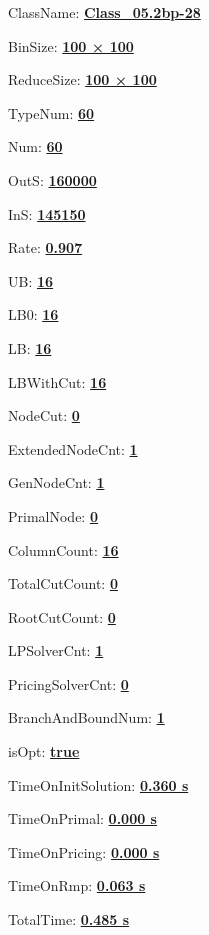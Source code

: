 \documentclass[11pt]{article}
\begin{document}
\pagestyle{empty}


ClassName: \underline{\textbf{Class_05.2bp-28}}
\par
BinSize: \underline{\textbf{100 × 100}}
\par
ReduceSize: \underline{\textbf{100 × 100}}
\par
TypeNum: \underline{\textbf{60}}
\par
Num: \underline{\textbf{60}}
\par
OutS: \underline{\textbf{160000}}
\par
InS: \underline{\textbf{145150}}
\par
Rate: \underline{\textbf{0.907}}
\par
UB: \underline{\textbf{16}}
\par
LB0: \underline{\textbf{16}}
\par
LB: \underline{\textbf{16}}
\par
LBWithCut: \underline{\textbf{16}}
\par
NodeCut: \underline{\textbf{0}}
\par
ExtendedNodeCnt: \underline{\textbf{1}}
\par
GenNodeCnt: \underline{\textbf{1}}
\par
PrimalNode: \underline{\textbf{0}}
\par
ColumnCount: \underline{\textbf{16}}
\par
TotalCutCount: \underline{\textbf{0}}
\par
RootCutCount: \underline{\textbf{0}}
\par
LPSolverCnt: \underline{\textbf{1}}
\par
PricingSolverCnt: \underline{\textbf{0}}
\par
BranchAndBoundNum: \underline{\textbf{1}}
\par
isOpt: \underline{\textbf{true}}
\par
TimeOnInitSolution: \underline{\textbf{0.360 s}}
\par
TimeOnPrimal: \underline{\textbf{0.000 s}}
\par
TimeOnPricing: \underline{\textbf{0.000 s}}
\par
TimeOnRmp: \underline{\textbf{0.063 s}}
\par
TotalTime: \underline{\textbf{0.485 s}}
\par
\newpage


\end{document}
